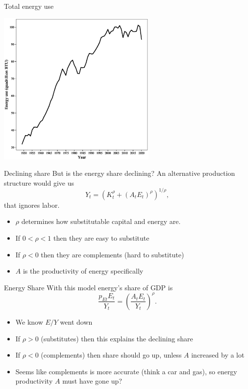 \begin{frame}{Total energy use}
\begin{center}
\includegraphics[height=3in]{../Figures/fig-ch10-fig4.eps}
\end{center}
\end{frame}

\begin{frame}{Declining share}
But is the energy share declining? An alternative production structure would give us
\begin{equation}
	Y_t = \left(K_t^{\rho} + (A_tE_t)^{\rho}\right)^{1/\rho}, \label{EQ_Y_CES}
\end{equation}
that ignores labor. 
\begin{itemize}
	\item $\rho$ determines how substitutable capital and energy are.
	\item If $0<\rho<1$ then they are easy to substitute
	\item If $\rho<0$ then they are complements (hard to substitute)
	\item $A$ is the productivity of energy specifically
\end{itemize}
\end{frame}

\begin{frame}{Energy Share}
With this model energy's share of GDP is
\begin{equation}
	\frac{p_{Et} E_t}{Y_t} = \left(\frac{A_tE_t}{Y_t}\right)^{\rho}. \nonumber
\end{equation}
\begin{itemize}
	\item We know $E/Y$ went down
	\item If $\rho > 0$ (substitutes) then this explains the declining share
	\item If $\rho < 0$ (complements) then share should go up, unless $A$ increased by a lot
	\item Seems like complements is more accurate (think a car and gas), so energy productivity $A$ must have gone up?
\end{itemize}
\end{frame}

